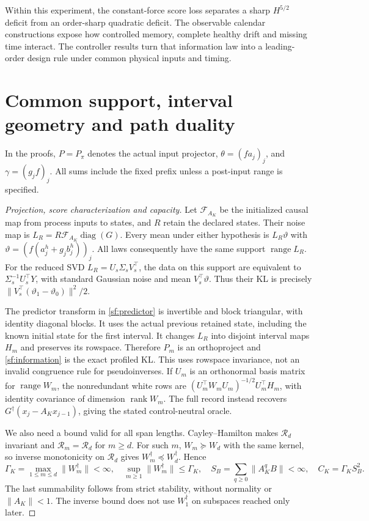 Within this experiment, the constant-force score loss separates a sharp
$H^{5/2}$ deficit from an order-sharp quadratic deficit. The observable
calendar constructions expose how controlled memory, complete healthy drift
and missing time interact. The controller results turn that information law
into a leading-order design rule under common physical inputs and timing.

\appendix
\section{Common support, interval geometry and path duality}\label{sf:geometry}
In the proofs, $P=P_\pi$ denotes the actual input projector,
$\theta=(fa_j)_j$, and $\gamma=(g_jf)_j$. All sums include the fixed prefix
unless a post-input range is specified.
\begin{proof}[Projection, score characterization and capacity]
Let $\mathcal F_{A_K}$ be the initialized causal map from process
inputs to states, and $R$ retain the declared states. Their noise map is
$L_R=R\mathcal F_{A_K}\operatorname{diag}(G)$.
Every mean under either hypothesis is $L_R\vartheta$ with
$\vartheta=(f(a_j^h+g_jb_j^h))_j$. All laws consequently have the
same support $\operatorname{range}L_R$.
For the reduced SVD $L_R=U_s\Sigma_sV_s^\top$, the data on this support
are equivalent to $\Sigma_s^{-1}U_s^\top Y$, with standard Gaussian
noise and mean $V_s^\top\vartheta$. Thus their KL is precisely
$\|V_s^\top(\vartheta_1-\vartheta_0)\|^2/2$.

The predictor transform in \eqref{sf:predictor} is invertible and
block triangular, with identity diagonal blocks. It uses the actual previous
retained state, including the known initial state for the first interval.
It changes $L_R$ into disjoint interval maps $H_m$ and preserves its
rowspace. Therefore $P_m$ is an orthoproject and
\eqref{sf:information} is the exact profiled KL.
This uses rowspace invariance, not an invalid congruence rule for
pseudoinverses. If $U_m$ is an orthonormal basis matrix for $\operatorname{range}W_m$, the
nonredundant white rows are
$(U_m^\top W_mU_m)^{-1/2}U_m^\top H_m$, with identity covariance
of dimension $\operatorname{rank}W_m$.
The full record instead recovers
$G^\dagger(x_j-A_Kx_{j-1})$, giving the stated control-neutral oracle.

We also need a bound valid for all span lengths.
Cayley--Hamilton makes $\mathcal R_d$ invariant and
$\mathcal R_m=\mathcal R_d$ for $m\ge d$.
For such $m$, $W_m\succeq W_d$ with the same kernel, so inverse
monotonicity on $\mathcal R_d$ gives $W_m^\dagger\preceq W_d^\dagger$.
Hence
\begin{equation}\label{sf:gamma}
\Gamma_K=\max_{1\le m\le d}\|W_m^\dagger\|<\infty,\quad
\sup_{m\ge1}\|W_m^\dagger\|\le\Gamma_K,\quad
S_B=\sum_{q\ge0}\|A_K^qB\|<\infty,\quad C_K=\Gamma_KS_B^2 .
\end{equation}
The last summability follows from strict stability, without normality
or $\|A_K\|<1$. The inverse bound does not use $W_1^\dagger$ on
subspaces reached only later.


\end{proof}
